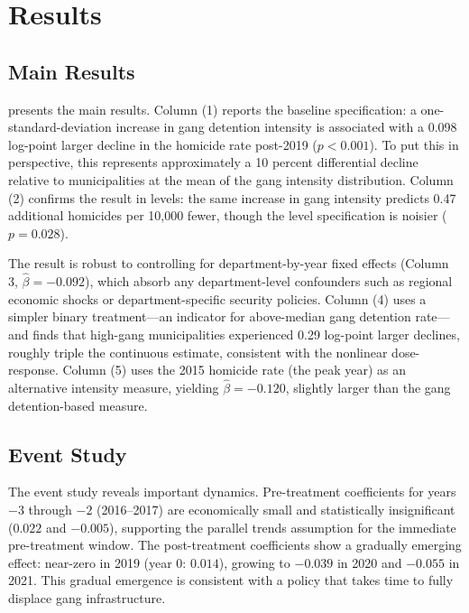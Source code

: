 \documentclass[12pt]{article}
\begin{document}
\section{Results}

\subsection{Main Results}



 presents the main results. Column (1) reports the baseline specification: a one-standard-deviation increase in gang detention intensity is associated with a 0.098 log-point larger decline in the homicide rate post-2019 ($p < 0.001$). To put this in perspective, this represents approximately a 10 percent differential decline relative to municipalities at the mean of the gang intensity distribution. Column (2) confirms the result in levels: the same increase in gang intensity predicts 0.47 additional homicides per 10,000 fewer, though the level specification is noisier ($p = 0.028$).

The result is robust to controlling for department-by-year fixed effects (Column 3, $\hat{\beta} = -0.092$), which absorb any department-level confounders such as regional economic shocks or department-specific security policies. Column (4) uses a simpler binary treatment---an indicator for above-median gang detention rate---and finds that high-gang municipalities experienced 0.29 log-point larger declines, roughly triple the continuous estimate, consistent with the nonlinear dose-response. Column (5) uses the 2015 homicide rate (the peak year) as an alternative intensity measure, yielding $\hat{\beta} = -0.120$, slightly larger than the gang detention-based measure.

\subsection{Event Study}

The event study reveals important dynamics. Pre-treatment coefficients for years $-3$ through $-2$ (2016--2017) are economically small and statistically insignificant ($0.022$ and $-0.005$), supporting the parallel trends assumption for the immediate pre-treatment window. The post-treatment coefficients show a gradually emerging effect: near-zero in 2019 (year 0: $0.014$), growing to $-0.039$ in 2020 and $-0.055$ in 2021. This gradual emergence is consistent with a policy that takes time to fully displace gang infrastructure.
\end{document}
